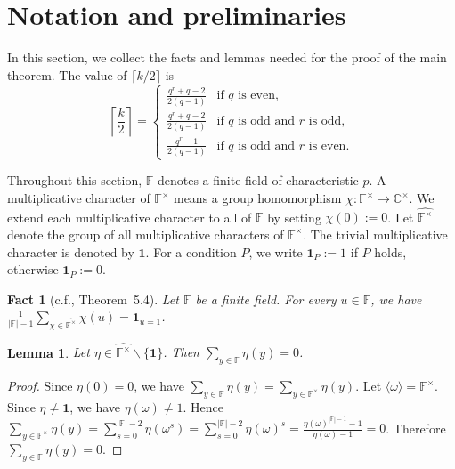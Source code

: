 \documentclass[10pt,a4paper]{article}
\newtheorem{lem}[thm]{Lemma}
\newtheorem{fac}[thm]{Fact}
\newcommand{\one}{\mathbf{1}}
\numberwithin{equation}{section}
\begin{document}
\section{Notation and preliminaries}\label{sec:lemmas}

In this section, we collect the facts and lemmas needed for the proof of the main theorem. The value of $\lceil k/2\rceil$ is 
\begin{equation}\label{eq:ceil-half-k}
\left\lceil \frac{k}{2}\right\rceil=
\begin{cases}
\frac{q^r+q-2}{2(q-1)} & \text{if $q$ is even,} \\
\frac{q^r+q-2}{2(q-1)} & \text{if $q$ is odd and $r$ is odd,} \\
\frac{q^r-1}{2(q-1)} & \text{if $q$ is odd and $r$ is even.}
\end{cases}
\end{equation}

Throughout this section, $\mathbb{F}$ denotes a finite field of characteristic $p$. A multiplicative character of $\mathbb{F}^{\times}$ means a group homomorphism $\chi:\mathbb{F}^{\times}\to\mathbb{C}^{\times}$. We extend each multiplicative character to all of $\mathbb{F}$ by setting $\chi(0):=0$. Let $\widehat{\mathbb{F}^{\times}}$ denote the group of all multiplicative characters of $\mathbb{F}^{\times}$. The trivial multiplicative character is denoted by $\one$. For a condition $P$, we write $\one_P:=1$ if $P$ holds, otherwise $\one_P:=0$.

\begin{fac}[c.f.\cite{LidlNiederreiter1997}, Theorem~5.4]\label{fac:standard-facts}
Let $\mathbb{F}$ be a finite field. For every $u\in \mathbb{F}$, we have $\frac{1}{|\mathbb{F}|-1}\sum_{\chi\in\widehat{\mathbb{F}^{\times}}}\chi(u)=\one_{u=1}$.
\end{fac}

\begin{lem}\label{lem:nontrivial-multiplicative-character-sum-zero}
Let $\eta\in\widehat{\mathbb{F}^{\times}}\backslash\{\one\}$. Then
$\sum_{y\in\mathbb{F}}\eta(y)=0$.
\end{lem}

\begin{proof}
Since $\eta(0)=0$, we have
$\sum_{y\in\mathbb{F}}\eta(y)=\sum_{y\in\mathbb{F}^{\times}}\eta(y)$.
Let $\langle \omega\rangle= \mathbb{F}^{\times}$. Since $\eta\neq\one$, we have $\eta(\omega)\neq 1$. Hence
$\sum_{y\in\mathbb{F}^{\times}}\eta(y)=\sum_{s=0}^{|\mathbb{F}|-2}\eta(\omega^s)=\sum_{s=0}^{|\mathbb{F}|-2}\eta(\omega)^s
=\frac{\eta(\omega)^{|\mathbb{F}|-1}-1}{\eta(\omega)-1}=0$.
Therefore $\sum_{y\in\mathbb{F}}\eta(y)=0$.
\end{proof}
\end{document}
